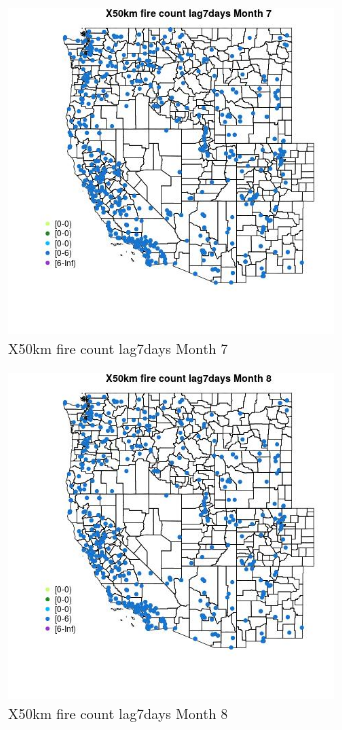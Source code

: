 \begin{figure} 
\centering  
\includegraphics[width=0.77\textwidth]{Code_Outputs/Report_ML_input_PM25_Step4_part_e_de_duplicated_aves_compiled_2019-05-14wNAs_MapObsMo7X50km_fire_count_lag7days.jpg} 
\caption{\label{fig:Report_ML_input_PM25_Step4_part_e_de_duplicated_aves_compiled_2019-05-14wNAsMapObsMo7X50km_fire_count_lag7days}X50km fire count lag7days Month 7} 
\end{figure} 
 

\clearpage 

\begin{figure} 
\centering  
\includegraphics[width=0.77\textwidth]{Code_Outputs/Report_ML_input_PM25_Step4_part_e_de_duplicated_aves_compiled_2019-05-14wNAs_MapObsMo8X50km_fire_count_lag7days.jpg} 
\caption{\label{fig:Report_ML_input_PM25_Step4_part_e_de_duplicated_aves_compiled_2019-05-14wNAsMapObsMo8X50km_fire_count_lag7days}X50km fire count lag7days Month 8} 
\end{figure} 
 

